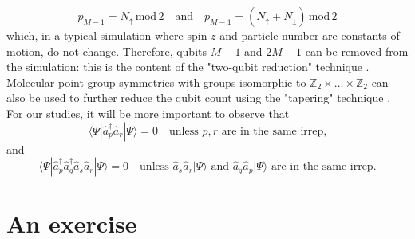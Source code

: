 \documentclass{article}
\newcommand{\CRE}[1]{\hat{a}^\dagger_{#1}}
\newcommand{\DIS}[1]{\hat{a}^{\phantom{\dagger}}_{#1}}
\begin{document}
\begin{equation}
p_{M-1} = N_\uparrow \, \mbox{mod} \, 2
\quad \mbox{and} \quad
p_{M-1} = (N_\uparrow + N_\downarrow) \, \mbox{mod} \, 2
\end{equation}
which, in a typical simulation where spin-$z$ and particle number are constants of motion, do not change. Therefore, qubits $M-1$ and $2M-1$ can be removed from the simulation: this is the content of the "two-qubit reduction" technique \cite{bravyi2017tapering}. Molecular point group symmetries with groups isomorphic to
$\mathbb{Z}_2 \times \dots \times \mathbb{Z}_2$ can also be used to further reduce the qubit count using the "tapering" technique \cite{bravyi2017tapering}. For our studies, it will be more important to observe that
\begin{equation}
\langle \Psi | \CRE{p} \DIS{r} | \Psi \rangle = 0 \quad \mbox{unless $p,r$ are in the same irrep,} 
\end{equation}
and
\begin{equation}
\langle \Psi | \CRE{p}  \CRE{q} \DIS{s}  \DIS{r} | \Psi \rangle = 0 \quad \mbox{unless $\DIS{s}  \DIS{r} | \Psi \rangle$ and $\DIS{q}  \DIS{p} | \Psi \rangle$ are in the same irrep.} 
\end{equation}

\section{An exercise}
\end{document}
